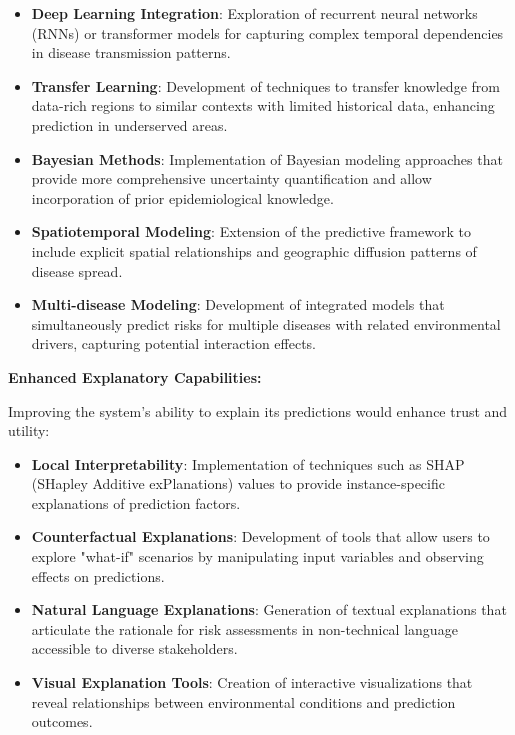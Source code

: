 \documentclass[12pt,a4paper]{report}
\begin{document}
\begin{itemize}
    \item \textbf{Deep Learning Integration}: Exploration of recurrent neural networks (RNNs) or transformer models for capturing complex temporal dependencies in disease transmission patterns.
    
    \item \textbf{Transfer Learning}: Development of techniques to transfer knowledge from data-rich regions to similar contexts with limited historical data, enhancing prediction in underserved areas.
    
    \item \textbf{Bayesian Methods}: Implementation of Bayesian modeling approaches that provide more comprehensive uncertainty quantification and allow incorporation of prior epidemiological knowledge.
    
    \item \textbf{Spatiotemporal Modeling}: Extension of the predictive framework to include explicit spatial relationships and geographic diffusion patterns of disease spread.
    
    \item \textbf{Multi-disease Modeling}: Development of integrated models that simultaneously predict risks for multiple diseases with related environmental drivers, capturing potential interaction effects.
\end{itemize}

\textbf{Enhanced Explanatory Capabilities:}

Improving the system's ability to explain its predictions would enhance trust and utility:

\begin{itemize}
    \item \textbf{Local Interpretability}: Implementation of techniques such as SHAP (SHapley Additive exPlanations) values to provide instance-specific explanations of prediction factors.
    
    \item \textbf{Counterfactual Explanations}: Development of tools that allow users to explore "what-if" scenarios by manipulating input variables and observing effects on predictions.
    
    \item \textbf{Natural Language Explanations}: Generation of textual explanations that articulate the rationale for risk assessments in non-technical language accessible to diverse stakeholders.
    
    \item \textbf{Visual Explanation Tools}: Creation of interactive visualizations that reveal relationships between environmental conditions and prediction outcomes.
\end{itemize}
\end{document}

